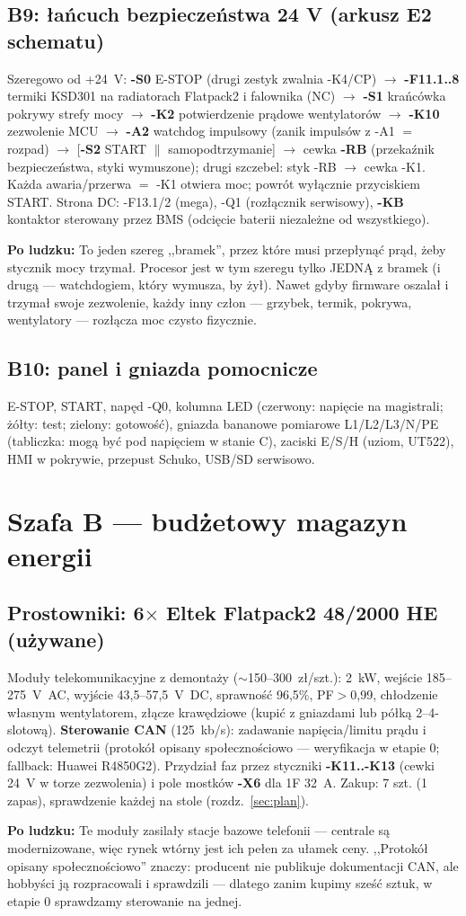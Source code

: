 \documentclass[11pt,a4paper]{article}
\newcommand{\why}[1]{\par\smallskip\noindent\colorbox{blue!6}{\parbox{0.965\linewidth}{\small\textbf{Po ludzku:} #1}}\par\smallskip}
\begin{document}
\subsection{B9: łańcuch bezpieczeństwa 24 V (arkusz E2 schematu)}
Szeregowo od +24~V: \textbf{-S0} E-STOP (drugi zestyk zwalnia -K4/CP) $\to$ \textbf{-F11.1..8}
termiki KSD301 na radiatorach Flatpack2 i falownika (NC) $\to$ \textbf{-S1} krańcówka pokrywy
strefy mocy $\to$ \textbf{-K2} potwierdzenie prądowe wentylatorów $\to$ \textbf{-K10} zezwolenie
MCU $\to$ \textbf{-A2} watchdog impulsowy (zanik impulsów z -A1 $=$ rozpad) $\to$ [\textbf{-S2}
START $\parallel$ samopodtrzymanie] $\to$ cewka \textbf{-RB} (przekaźnik bezpieczeństwa, styki
wymuszone); drugi szczebel: styk -RB $\to$ cewka -K1. Każda awaria/przerwa $=$ -K1 otwiera moc;
powrót wyłącznie przyciskiem START. Strona DC: -F13.1/2 (mega), -Q1 (rozłącznik serwisowy),
\textbf{-KB} kontaktor sterowany przez BMS (odcięcie baterii niezależne od wszystkiego).
\why{To jeden szereg ,,bramek'', przez które musi przepłynąć prąd, żeby stycznik mocy trzymał.
Procesor jest w tym szeregu tylko JEDNĄ z bramek (i drugą --- watchdogiem, który wymusza, by żył).
Nawet gdyby firmware oszalał i trzymał swoje zezwolenie, każdy inny człon --- grzybek, termik,
pokrywa, wentylatory --- rozłącza moc czysto fizycznie.}
\subsection{B10: panel i gniazda pomocnicze}
E-STOP, START, napęd -Q0, kolumna LED (czerwony: napięcie na magistrali; żółty: test; zielony:
gotowość), gniazda bananowe pomiarowe L1/L2/L3/N/PE (tabliczka: mogą być pod napięciem w stanie C),
zaciski E/S/H (uziom, UT522), HMI w pokrywie, przepust Schuko, USB/SD serwisowo.

\section{Szafa B --- budżetowy magazyn energii}
\subsection{Prostowniki: 6$\times$ Eltek Flatpack2 48/2000 HE (używane)}
Moduły telekomunikacyjne z demontaży ($\sim$150--300~zł/szt.): 2~kW, wejście 185--275~V~AC,
wyjście 43,5--57,5~V~DC, sprawność 96,5\%, PF$>$0,99, chłodzenie własnym wentylatorem, złącze
krawędziowe (kupić z gniazdami lub półką 2--4-slotową). \textbf{Sterowanie CAN} (125~kb/s):
zadawanie napięcia/limitu prądu i odczyt telemetrii (protokół opisany społecznościowo ---
weryfikacja w etapie 0; fallback: Huawei R4850G2). Przydział faz przez styczniki \textbf{-K11..-K13}
(cewki 24~V w torze zezwolenia) i pole mostków \textbf{-X6} dla 1F 32~A. Zakup: 7 szt. (1 zapas),
sprawdzenie każdej na stole (rozdz.~\ref{sec:plan}).
\why{Te moduły zasilały stacje bazowe telefonii --- centrale są modernizowane, więc rynek wtórny
jest ich pełen za ułamek ceny. ,,Protokół opisany społecznościowo'' znaczy: producent nie
publikuje dokumentacji CAN, ale hobbyści ją rozpracowali i sprawdzili --- dlatego zanim kupimy
sześć sztuk, w etapie 0 sprawdzamy sterowanie na jednej.}
\end{document}
